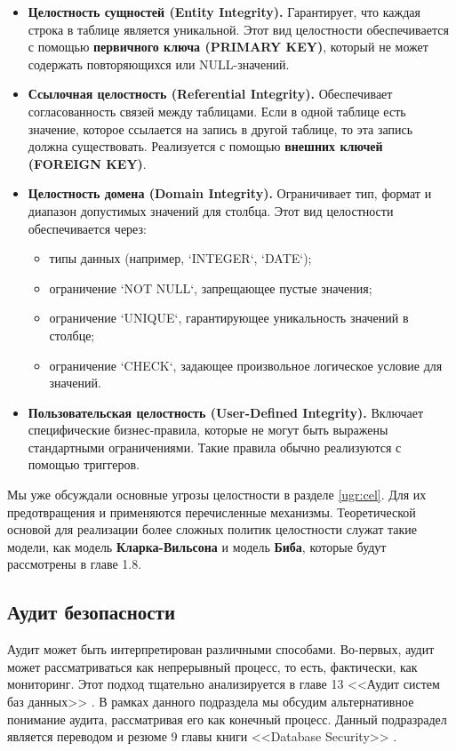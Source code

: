 \begin{itemize}
    \item \textbf{Целостность сущностей (Entity Integrity).} Гарантирует, что каждая строка в таблице является уникальной. Этот вид целостности обеспечивается с помощью \textbf{первичного ключа (PRIMARY KEY)}, который не может содержать повторяющихся или NULL-значений.
    
    \item \textbf{Ссылочная целостность (Referential Integrity).} Обеспечивает согласованность связей между таблицами. Если в одной таблице есть значение, которое ссылается на запись в другой таблице, то эта запись должна существовать. Реализуется с помощью \textbf{внешних ключей (FOREIGN KEY)}.
    
    \item \textbf{Целостность домена (Domain Integrity).} Ограничивает тип, формат и диапазон допустимых значений для столбца. Этот вид целостности обеспечивается через:
    \begin{itemize}
        \item типы данных (например, `INTEGER`, `DATE`);
        \item ограничение `NOT NULL`, запрещающее пустые значения;
        \item ограничение `UNIQUE`, гарантирующее уникальность значений в столбце;
        \item ограничение `CHECK`, задающее произвольное логическое условие для значений.
    \end{itemize}
    
    \item \textbf{Пользовательская целостность (User-Defined Integrity).} Включает специфические бизнес-правила, которые не могут быть выражены стандартными ограничениями. Такие правила обычно реализуются с помощью триггеров.
\end{itemize}

Мы уже обсуждали основные угрозы целостности в разделе \ref{ugr:cel}. Для их предотвращения и применяются перечисленные механизмы. Теоретической основой для реализации более сложных политик целостности служат такие модели, как модель \textbf{Кларка-Вильсона} и модель \textbf{Биба}, которые будут рассмотрены в главе 1.8.

\subsection{Аудит безопасности}

Аудит может быть интерпретирован различными способами. Во-первых, аудит может рассматриваться как непрерывный процесс, то есть, фактически, как мониторинг. Этот подход тщательно анализируется в главе 13 <<Аудит систем баз данных>> \autocite{Smirnov2007}.
В рамках данного подраздела мы обсудим альтернативное понимание аудита, рассматривая его как конечный процесс. Данный подразрадел является переводом и резюме 9 главы книги <<Database Security>> \autocite{DatabaseSecurity}.

